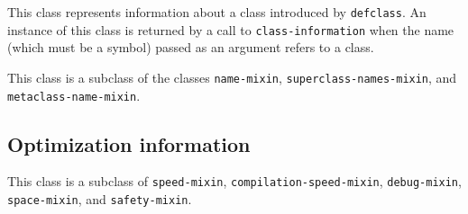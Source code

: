 
This class represents information about a class introduced by
\texttt{defclass}.  An instance of this class is returned by a call to
\texttt{class-information} when the name (which must be a symbol)
passed as an argument refers to a class.

This class is a subclass of the classes \texttt{name-mixin},
\texttt{superclass-names-mixin},  and
\texttt{metaclass-name-mixin}.

\subsection{Optimization information}


This class is a subclass of \texttt{speed-mixin},
\texttt{compilation-speed-mixin}, \texttt{debug-mixin},
\texttt{space-mixin}, and \texttt{safety-mixin}.
